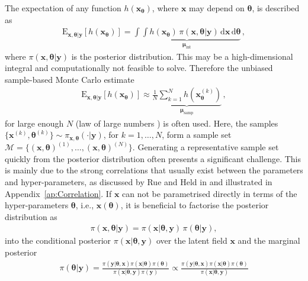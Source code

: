 The expectation of any function $h(\bm{x}_{\bm{\theta}})$, where $\bm{x}$ may depend on $\bm{\theta}$, is described as 
\begin{align}
	\text{E}_{\bm{x},\bm{\theta}|\bm{y}} [h(\bm{x}_{\bm{\theta}})] =  \underbrace{\int \int   h(\bm{x}_{\bm{\theta}}) \,  \pi(\bm{x}, \bm{\theta} | \bm{y} ) \, \text{d} \bm{x}  \, \text{d} \bm{\theta}}_{\bm{\mu}_{\text{int}}}   \label{eq:expPos} \, ,
\end{align}
where $\pi(\bm{x}, \bm{\theta} | \bm{y} )$ is the posterior distribution.
This may be a high-dimensional integral and computationally not feasible to solve.
Therefore the unbiased sample-based Monte Carlo estimate \cite{roberts2004general}
\begin{align}
	\label{eq:sampMean}
	\text{E}_{\bm{x},\bm{\theta}|\bm{y}} [h(\bm{x}_{\bm{\theta}})] \approx \underbrace{ \frac{1}{N} \sum_{k=1}^{N} h(\bm{x}^{(k)}_{\bm{\theta}})  }_{\bm{\mu}_{\text{samp}}} \, ,
\end{align}
for large enough $N$ (law of large numbers \cite[Chapter 17]{tweedie2009measprob}) is often used.
Here, the samples $\{\bm{x}^{(k)},\bm{\theta}^{(k)} \}\sim \pi_{\bm{x}, \bm{\theta}}(\cdot|\bm{y})$, for $k = 1, \dots, N$, form a sample set $\mathcal{M} =\{ (\bm{x},\bm{\theta})^{(1)}, \dots ,  (\bm{x},\bm{\theta})^{(N)} \}$.
Generating a representative sample set quickly from the posterior distribution often presents a significant challenge. This is mainly due to the strong correlations that usually exist between the parameters and hyper-parameters, as discussed by Rue and Held in \cite{rue2005gaussian} and illustrated in Appendix~\ref{ap:Correlation}.
If $\bm{x}$ can not be parametrised directly in terms of the hyper-parameters $\bm{\theta}$, i.e., $\bm{x}(\bm{\theta})$, it is beneficial to factorise the posterior distribution as
\begin{align}
	\pi(\bm{x}, \bm{\theta} |  \bm{y}) = \pi(\bm{x} |  \bm{\theta}, \bm{y}) \, \pi(\bm{\theta} |   \bm{y}), \label{eq:MTC}
\end{align}
into the conditional posterior $\pi(\bm{x} |  \bm{\theta}, \bm{y})$ over the latent field $\bm{x}$ and the marginal posterior 
\begin{align}
	\pi(\bm{\theta} |   \bm{y}) =  \frac{ \pi(   \bm{y} | \bm{\theta} ,\bm{x})  \pi( \bm{x} | \bm{\theta} )  \pi(\bm{\theta}) }{ \pi(\bm{x} | \bm{\theta} ,   \bm{y})   \pi( \bm{y})} \propto \frac{ \pi(   \bm{y} | \bm{\theta} ,\bm{x})  \pi( \bm{x} | \bm{\theta} )  \pi(\bm{\theta}) }{ \pi(\bm{x} | \bm{\theta} ,   \bm{y}) }
\end{align}
